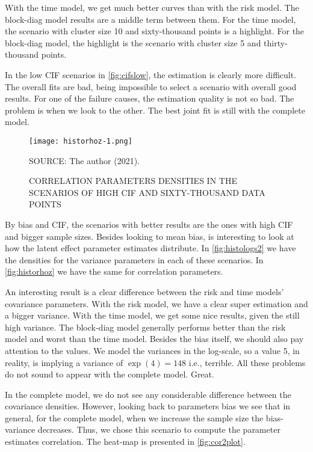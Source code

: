 With the time model, we get much better curves than with the risk
model. The block-diag model results are a middle term between them. For
the time model, the scenario with cluster size 10 and sixty-thousand
points is a highlight. For the block-diag model, the highlight is the
scenario with cluster size 5 and thirty-thousand points.

In the low CIF scenarios in \autoref{fig:cifslow}, the estimation is
clearly more difficult. The overall fits are bad, being impossible to
select a scenario with overall good results. For one of the failure
causes, the estimation quality is not so bad. The problem is when we
look to the other. The best joint fit is still with the complete model.

\begin{figure}[H]
 \setlength{\abovecaptionskip}{.0001pt}
 \caption{CORRELATION PARAMETERS DENSITIES IN THE SCENARIOS OF HIGH CIF
          AND SIXTY-THOUSAND DATA POINTS}
 \vspace{0.2cm}\centering
 \texttt{[image: historhoz-1.png]}\\
 \begin{footnotesize}
  SOURCE: The author (2021).
 \end{footnotesize}
 \label{fig:historhoz}
\end{figure}

By bias and CIF, the scenarios with better results are the ones with
high CIF and bigger sample sizes. Besides looking to mean bias, is
interesting to look at how the latent effect parameter estimates
distribute. In \autoref{fig:histologs2} we have the densities for the
variance parameters in each of these scenarios. In
\autoref{fig:historhoz} we have the same for correlation parameters.

An interesting result is a clear difference between the risk and time
models' covariance parameters. With the risk model, we have a clear
super estimation and a bigger variance. With the time model, we get some
nice results, given the still high variance. The block-diag model
generally performs better than the risk model and worst than the time
model. Besides the bias itself, we should also pay attention to the
values. We model the variances in the log-scale, so a value 5, in
reality, is implying a variance of \(\exp(4) = 148\) i.e., terrible. All
these problems do not sound to appear with the complete model. Great.

In the complete model, we do not see any considerable difference between
the covariance densities. However, looking back to parameters bias we
see that in general, for the complete model, when we increase the sample
size the bias-variance decreases. Thus, we chose this scenario to
compute the parameter estimates correlation. The heat-map is presented
in \autoref{fig:cor2plot}.

